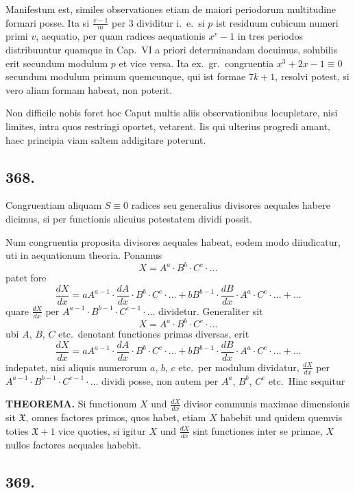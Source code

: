 \documentclass[12pt,a4paper]{article}
\begin{document}
Manifestum est, similes observationes etiam de maiori periodorum multitudine formari posse. Ita si $\frac{v-1}{m}$ per $3$ dividitur i.~e.~si $p$ ist residuum cubicum numeri primi $v$, aequatio, per quam radices aequationis $x^v-1$ in tres periodos distribuuntur quamque in Cap.~VI a priori determinandam docuimus, solubilis erit secundum modulum $p$ et vice versa. Ita ex.~gr.~congruentia $x^3+2x-1\equiv 0$ secundum modulum primum quemcunque, qui ist formae $7k+1$, resolvi potest, si vero aliam formam habeat, non poterit.

Non difficile nobis foret hoc Caput multis aliis observationibus locupletare, nisi limites, intra quos restringi oportet, vetarent. Iis qui ulterius progredi amant, haec principia viam saltem addigitare poterunt.

\subsection*{368.}

Congruentiam aliquam $S\equiv 0$ radices seu generalius divisores aequales habere dicimus, si per functionis alicuius potestatem dividi possit.

Num congruentia proposita divisores aequales habeat, eodem modo diiudicatur, uti in aequationum theoria. Ponamus
\[
X = A^a\cdot B^b\cdot C^c\cdot \ldots
\]
patet fore
\[
\frac{dX}{dx} = aA^{a-1}\cdot\frac{dA}{dx}\cdot B^b\cdot C^c\cdot\ldots + bB^{b-1}\cdot\frac{dB}{dx}\cdot A^a\cdot C^c\cdot\ldots + \ldots
\]
quare $\frac{dX}{dx}$ per $A^{a-1}\cdot B^{b-1}\cdot C^{c-1}\cdot\ldots$ dividetur. Generaliter sit
\[
X = A^a\cdot B^b\cdot C^c\cdot\ldots
\]
ubi $A$, $B$, $C$ etc.~denotant functiones primas diversas, erit
\[
\frac{dX}{dx} = aA^{a-1}\cdot\frac{dA}{dx}\cdot B^b\cdot C^c\cdot\ldots + bB^{b-1}\cdot\frac{dB}{dx}\cdot A^a\cdot C^c\cdot\ldots + \ldots
\]
indepatet, nisi aliquis numerorum $a$, $b$, $c$ etc.~per modulum dividatur, $\frac{dX}{dx}$ per $A^{a-1}\cdot B^{b-1}\cdot C^{c-1}\cdot\ldots$ dividi posse, non autem per $A^a$, $B^b$, $C^c$ etc.~Hinc sequitur

\textbf{THEOREMA.} Si functionum $X$ und $\frac{dX}{dx}$ divisor communis maximae dimensionis sit $\mathfrak{X}$, omnes factores primos, quos habet, etiam $X$ habebit und quidem quemvis toties $\mathfrak{X}+1$ vice quoties, si igitur $X$ und $\frac{dX}{dx}$ sint functiones inter se primae, $X$ nullos factores aequales habebit.

\subsection*{369.}
\end{document}

